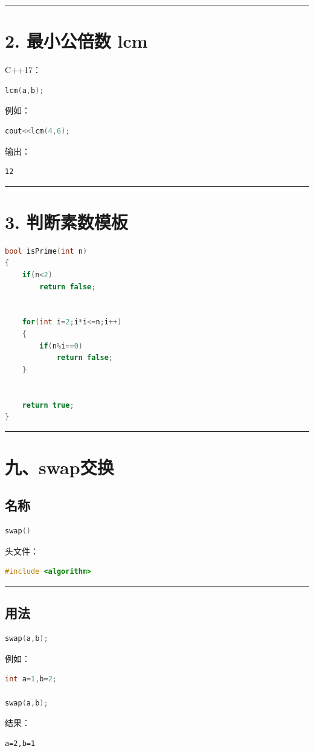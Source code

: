 \documentclass[10pt,twocolumn]{extarticle}
\begin{document}
\noindent\rule{\linewidth}{0.4pt}

\section{2. 最小公倍数 lcm}

C++17：
\begin{lstlisting}[language=C++]
lcm(a,b);
\end{lstlisting}
例如：
\begin{lstlisting}[language=C++]
cout<<lcm(4,6);
\end{lstlisting}
输出：
\begin{lstlisting}
12
\end{lstlisting}

\noindent\rule{\linewidth}{0.4pt}

\section{3. 判断素数模板}
\begin{lstlisting}[language=C++]
bool isPrime(int n)
{
    if(n<2)
        return false;


    for(int i=2;i*i<=n;i++)
    {
        if(n%i==0)
            return false;
    }


    return true;
}
\end{lstlisting}

\noindent\rule{\linewidth}{0.4pt}

\section{九、swap交换}

\subsection{名称}
\begin{lstlisting}[language=C++]
swap()
\end{lstlisting}
头文件：
\begin{lstlisting}[language=C++]
#include <algorithm>
\end{lstlisting}

\noindent\rule{\linewidth}{0.4pt}

\subsection{用法}
\begin{lstlisting}[language=C++]
swap(a,b);
\end{lstlisting}
例如：
\begin{lstlisting}[language=C++]
int a=1,b=2;

swap(a,b);
\end{lstlisting}
结果：
\begin{lstlisting}
a=2,b=1
\end{lstlisting}
\end{document}
